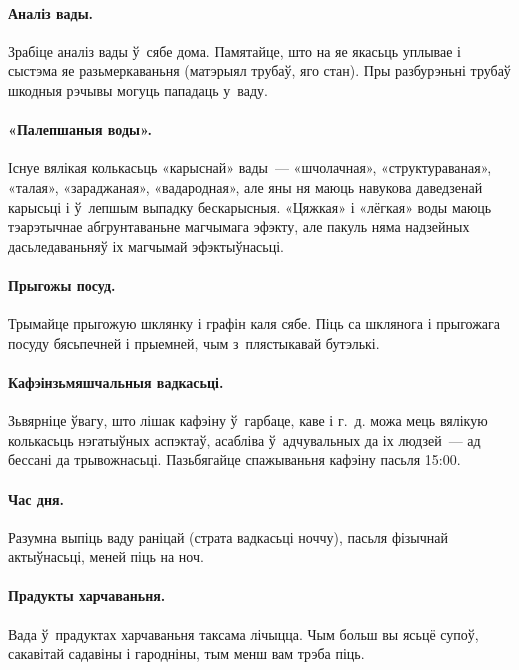 \paragraph{Аналіз вады.}
Зрабіце аналіз вады ў~сябе дома. Памятайце, што на яе якасьць уплывае і сыстэма яе разьмеркаваньня (матэрыял трубаў, яго стан). Пры разбурэньні трубаў шкодныя рэчывы могуць пападаць у~ваду.

\paragraph{«Палепшаныя воды».}
Існуе вялікая колькасьць «карыснай» вады~--- «шчолачная», «структураваная», «талая», «зараджаная», «вадародная», але яны ня маюць навукова даведзенай карысьці і ў~лепшым выпадку бескарысныя. «Цяжкая» і «лёгкая» воды маюць тэарэтычнае абгрунтаваньне магчымага эфэкту, але пакуль няма надзейных дасьледаваньняў іх магчымай эфэктыўнасьці.


\paragraph{Прыгожы посуд.}
Трымайце прыгожую шклянку і графін каля сябе. Піць са шклянога і прыгожага посуду бясьпечней і прыемней, чым з~плястыкавай бутэлькі.

\paragraph{Кафэінзьмяшчальныя вадкасьці.}
Зьвярніце ўвагу, што лішак кафэіну ў~гарбаце, каве і г.~д. можа мець вялікую колькасьць нэгатыўных аспэктаў, асабліва ў~адчувальных да іх людзей~--- ад бессані да трывожнасьці. Пазьбягайце спажываньня кафэіну пасьля 15:00.

\paragraph{Час дня.}
Разумна выпіць ваду раніцай (страта вадкасьці ноччу), пасьля фізычнай актыўнасьці, меней піць на ноч.

\paragraph{Прадукты харчаваньня.}
Вада ў~прадуктах харчаваньня таксама лічыцца. Чым больш вы ясьцё супоў, сакавітай садавіны і гародніны, тым менш вам трэба піць.

